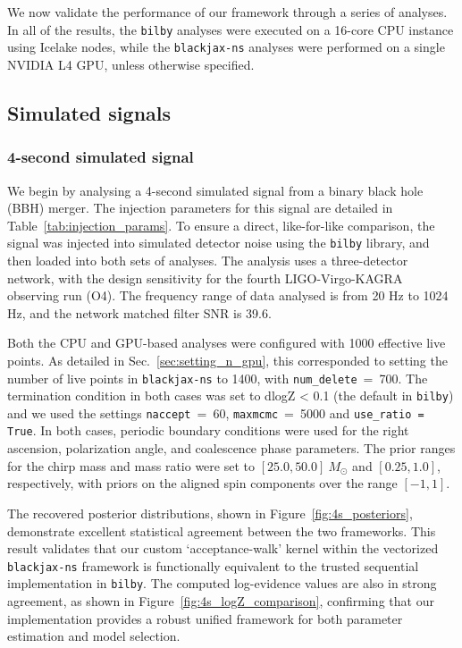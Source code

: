 \documentclass[fleqn,usenatbib]{mnras}
\begin{document}
We now validate the performance of our framework through a series of
analyses. In all of the results, the \texttt{bilby} analyses
were executed on a 16-core CPU instance using Icelake nodes, while the \texttt{blackjax-ns}
analyses were performed on a single NVIDIA L4 GPU, unless otherwise specified.

\subsection{Simulated signals}

\subsubsection{4-second simulated signal}
\label{sec:4s_simulated_signal}

We begin by analysing a 4-second simulated signal from a binary black
hole (BBH) merger. The injection parameters for this signal are
detailed in Table~\ref{tab:injection_params}. To ensure a direct,
like-for-like comparison, the signal was injected into simulated
detector noise using the \texttt{bilby} library, and 
then loaded into both sets of analyses. The analysis
uses a three-detector network, with the design
sensitivity for the fourth LIGO-Virgo-KAGRA observing run (O4).
The frequency range of data analysed is from 20 Hz to 1024 Hz, 
and the network matched filter SNR is 39.6. 

Both the CPU and GPU-based analyses were configured with 1000 effective live
points. As detailed in Sec.~\ref{sec:setting_n_gpu}, this corresponded to
setting the number of live points in \texttt{blackjax-ns} to 1400, with \mbox{\texttt{num\_delete} = 700}.
The termination condition in both cases was set to dlogZ < 0.1 (the default in \texttt{bilby})
and we used the settings \mbox{\texttt{naccept} = 60}, \mbox{\texttt{maxmcmc} = 5000} and \mbox{\texttt{use\_ratio = True}}. 
In both cases, periodic boundary conditions were used for the right ascension, 
polarization angle, and coalescence phase parameters. The prior ranges
for the chirp mass and mass ratio were set to $[25.0, 50.0]~M_{\odot}$
and $[0.25, 1.0]$, respectively, with priors on the aligned
spin components over the range $[-1, 1]$. 

The recovered posterior distributions, shown in
Figure~\ref{fig:4s_posteriors}, demonstrate excellent statistical
agreement between the two frameworks. This result validates that our
custom `acceptance-walk' kernel within the vectorized \texttt{blackjax-ns}
framework is functionally equivalent to the trusted sequential
implementation in \texttt{bilby}. The computed log-evidence values are
also in strong agreement, as shown in Figure~\ref{fig:4s_logZ_comparison},
confirming that our implementation provides a robust unified framework for both
parameter estimation and model selection. 
\end{document}
